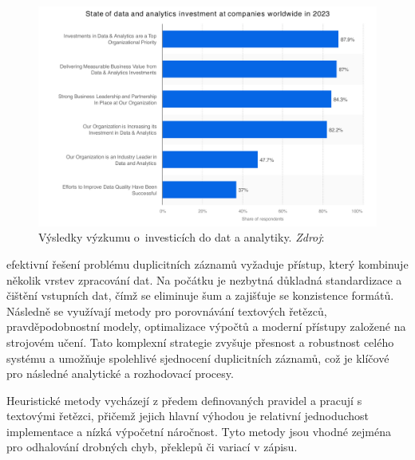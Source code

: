 \begin{figure}[htb]
  \centering
  \includegraphics[width=\textwidth]{images/statista-global-state-of-data-and-analytics-investment-2023.pdf}
  \caption{Výsledky výzkumu o~investicích do dat a analytiky. \newline
    \textit{Zdroj}: \cite{newvantage_partners_global_2024}}
  \label{fig:google-trends}
\end{figure}


efektivní řešení problému duplicitních záznamů vyžaduje přístup, který kombinuje několik vrstev zpracování dat. Na počátku je nezbytná důkladná standardizace a čištění vstupních dat, čímž se eliminuje šum a zajišťuje se konzistence formátů. Následně se využívají metody pro porovnávání textových řetězců, pravděpodobnostní modely, optimalizace výpočtů a moderní přístupy založené na strojovém učení. Tato komplexní strategie zvyšuje přesnost a robustnost celého systému a umožňuje spolehlivé sjednocení duplicitních záznamů, což je klíčové pro následné analytické a rozhodovací procesy.

Heuristické metody vycházejí z předem definovaných pravidel a pracují s textovými řetězci, přičemž jejich hlavní výhodou je relativní jednoduchost implementace a nízká výpočetní náročnost. Tyto metody jsou vhodné zejména pro odhalování drobných chyb, překlepů či variací v zápisu.

